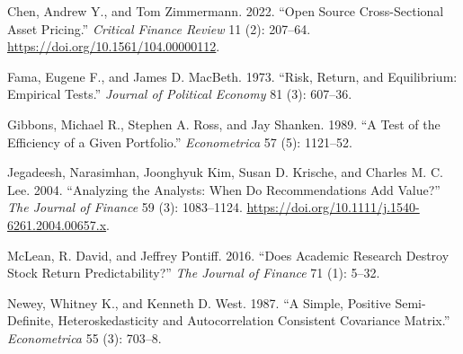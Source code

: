 \documentclass[
  letterpaper,
  DIV=11,
  numbers=noendperiod]{scrartcl}
\newlength{\cslhangindent}
\newenvironment{CSLReferences}[2] %
 {\begin{list}{}{%
  \setlength{\itemindent}{0pt}
  \setlength{\leftmargin}{0pt}
  \setlength{\parsep}{0pt}
  \ifodd #1
   \setlength{\leftmargin}{\cslhangindent}
   \setlength{\itemindent}{-1\cslhangindent}
  \fi
  \setlength{\itemsep}{#2\baselineskip}}}
 {\end{list}}
\begin{document}
\label{refs}
\begin{CSLReferences}{1}{0}
Chen, Andrew Y., and Tom Zimmermann. 2022. {``Open Source
Cross-Sectional Asset Pricing.''} \emph{Critical Finance Review} 11 (2):
207--64. \url{https://doi.org/10.1561/104.00000112}.

Fama, Eugene F., and James D. MacBeth. 1973. {``Risk, Return, and
Equilibrium: Empirical Tests.''} \emph{Journal of Political Economy} 81
(3): 607--36.

Gibbons, Michael R., Stephen A. Ross, and Jay Shanken. 1989. {``A Test
of the Efficiency of a Given Portfolio.''} \emph{Econometrica} 57 (5):
1121--52.

Jegadeesh, Narasimhan, Joonghyuk Kim, Susan D. Krische, and Charles M.
C. Lee. 2004. {``Analyzing the Analysts: When Do Recommendations Add
Value?''} \emph{The Journal of Finance} 59 (3): 1083--1124.
\url{https://doi.org/10.1111/j.1540-6261.2004.00657.x}.

McLean, R. David, and Jeffrey Pontiff. 2016. {``Does Academic Research
Destroy Stock Return Predictability?''} \emph{The Journal of Finance} 71
(1): 5--32.

Newey, Whitney K., and Kenneth D. West. 1987. {``A Simple, Positive
Semi-Definite, Heteroskedasticity and Autocorrelation Consistent
Covariance Matrix.''} \emph{Econometrica} 55 (3): 703--8.

\end{CSLReferences}
\end{document}
